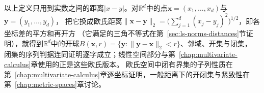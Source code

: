 以上定义只用到实数之间的距离$|x-y|$。对$\mathbb R^d$中的点$\bm x=(x_1,\ldots,x_d)$与$\bm y=(y_1,\ldots,y_d)$，
把它换成欧氏距离$\lVert\bm x-\bm y\rVert_2=\bigl(\sum_{j=1}^d(x_j-y_j)^2\bigr)^{1/2}$，即各坐标差的平方和再开方
（它满足的三角不等式在第~\ref{sec:ls-norms-distances}节证明），就得到$\mathbb R^d$中的开球$B(\bm x,r)=\{\bm y:\lVert\bm y-\bm x\rVert_2<r\}$、邻域、开集与闭集，
闭集的序列判据连同证明逐字成立；线性空间部分与第~\ref{chap:multivariate-calculus}章使用的正是这些欧氏版本。
欧氏空间中闭有界集的子列性质在第~\ref{chap:multivariate-calculus}章逐坐标证明，一般距离下的开闭集与紧致性在第~\ref{chap:metric-spaces}章讨论。

\FloatBarrier
